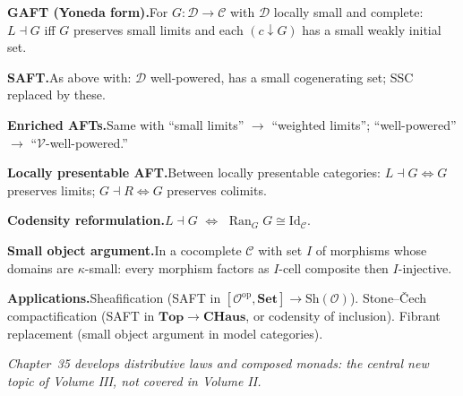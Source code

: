 \begin{formalrestatement}
\textbf{GAFT (Yoneda form).}\quad For $G : \mathcal{D} \to \mathcal{C}$
with $\mathcal{D}$ locally small and complete: $L \dashv G$ iff $G$ preserves
small limits and each $(c \downarrow G)$ has a small weakly initial set.

\medskip
\textbf{SAFT.}\quad As above with: $\mathcal{D}$ well-powered, has a small
cogenerating set; SSC replaced by these.

\medskip
\textbf{Enriched AFTs.}\quad Same with ``small limits'' $\to$ ``weighted
limits''; ``well-powered'' $\to$ ``$\mathcal{V}$-well-powered.''

\medskip
\textbf{Locally presentable AFT.}\quad Between locally presentable
categories: $L \dashv G \iff G$ preserves limits; $G \dashv R \iff G$
preserves colimits.

\medskip
\textbf{Codensity reformulation.}\quad $L \dashv G$ $\iff$
$\operatorname{Ran}_G G \cong \mathrm{Id}_\mathcal{C}$.

\medskip
\textbf{Small object argument.}\quad In a cocomplete $\mathcal{C}$ with set
$I$ of morphisms whose domains are $\kappa$-small: every morphism
factors as $I$-cell composite then $I$-injective.

\medskip
\textbf{Applications.}\quad Sheafification (SAFT in $[\mathcal{O}^{\mathrm{op}},
\mathbf{Set}] \to \mathrm{Sh}(\mathcal{O})$). Stone--\v Cech compactification
(SAFT in $\mathbf{Top} \to \mathbf{CHaus}$, or codensity of inclusion).
Fibrant replacement (small object argument in model categories).

\medskip
\noindent\textit{Chapter~35 develops \emph{distributive laws and composed
monads}: the central new topic of Volume III, not covered in Volume II.}
\end{formalrestatement}
